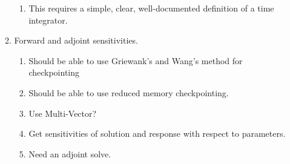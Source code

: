 \begin{enumerate}
\begin{enumerate}
\begin{enumerate}
\item This requires a simple, clear, well-documented definition of a time
integrator.
\end{enumerate}
\item Forward and adjoint sensitivities.

\begin{enumerate}
\item Should be able to use Griewank's and Wang's method for checkpointing
\item Should be able to use reduced memory checkpointing.
\item Use Multi-Vector?
\item Get sensitivities of solution and response with respect to parameters.
\item Need an adjoint solve.
\end{enumerate}
\end{enumerate}
\end{enumerate}

